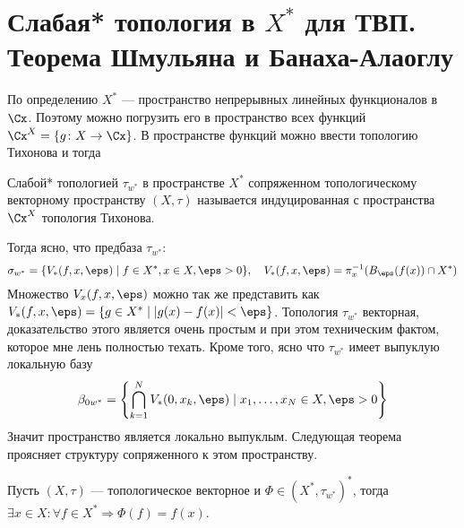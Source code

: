 \newpage
\section{Слабая* топология в $X^*$ для ТВП. Теорема Шмульяна и Банаха-Алаоглу}
По определению $X^*$ --- пространство непрерывных линейных функционалов в $\Cx$. Поэтому можно погрузить его в пространство всех функций $\Cx^X = \{g \colon X \to \Cx\}$. В пространстве функций можно ввести топологию Тихонова и тогда 
\begin{definition}
	Слабой* топологией $\tau_{w^*}$ в пространстве $X^*$ сопряженном топологическому векторному пространству $(X,\tau)$ называется индуцированная с пространства $\Cx^X$ топология Тихонова. 
\end{definition}
Тогда ясно, что предбаза $\tau_{w^*}$:
$$
\sigma_{w^*} = \{V_*(f,x,\eps) \mid f \in X^*, x\in X, \eps > 0\}, \quad V_*(f,x,\eps) = \pi_x^{-1}(B_\eps(f(x)) \cap X^*)
$$
Множество $V_x(f,x,\eps)$ можно так же представить как $V_*(f,x,\eps) = \{g \in X^* \mid |g(x) -f(x)| < \eps\}$. Топология $\tau_{w^*}$ векторная, доказательство этого является очень простым и при этом техническим фактом, которое мне лень полностью техать. Кроме того, ясно что $\tau_{w^*}$ имеет выпуклую локальную базу
$$
\beta_{0w^*} = \left\{\bigcap_{k=1}^N V_*(0,x_k, \eps) \mid x_1,\dots, x_N \in X, \eps > 0\right\}
$$ Значит пространство является локально выпуклым. Следующая теорема проясняет структуру сопряженного к этом пространству.
\begin{theorem}[Шмульян]\label{th:shulian}
	Пусть $(X,\tau)$ --- топологическое векторное и $\Phi \in (X^*, \tau_{w^*})^*$, тогда $\exists x \in X \colon\forall f \in X^* \Rightarrow   \Phi(f) = f(x)$. 
\end{theorem}
